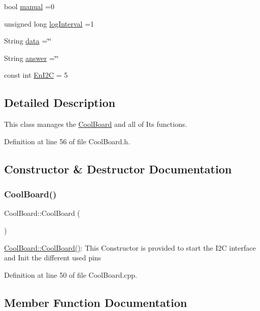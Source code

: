 \begin{DoxyCompactItemize}
\item 
bool \hyperlink{class_cool_board_a7c8e505a5804b109e112d5a03df6ea2b}{manual} =0
\item 
unsigned long \hyperlink{class_cool_board_a84bc94413b64973e4aba8c467c97006c}{log\+Interval} =1
\item 
String \hyperlink{class_cool_board_a427fb753dd8575bdf821c70a5c63d695}{data} =\char`\"{}\char`\"{}
\item 
String \hyperlink{class_cool_board_a7b835fafd449e5282f7f91d787a2dc15}{answer} =\char`\"{}\char`\"{}
\item 
const int \hyperlink{class_cool_board_af1fe1376fc66f93dee80b327ca695377}{En\+I2C} = 5
\end{DoxyCompactItemize}


\subsection{Detailed Description}
This class manages the \hyperlink{class_cool_board}{Cool\+Board} and all of Its functions. 

Definition at line 56 of file Cool\+Board.\+h.



\subsection{Constructor \& Destructor Documentation}
\mbox{\label{class_cool_board_a8b88fd781e22e93025dd63474113b7e4}} 
\subsubsection{\texorpdfstring{Cool\+Board()}{CoolBoard()}}
{\footnotesize\ttfamily Cool\+Board\+::\+Cool\+Board (\begin{DoxyParamCaption}{ }\end{DoxyParamCaption})}

\hyperlink{class_cool_board_a8b88fd781e22e93025dd63474113b7e4}{Cool\+Board\+::\+Cool\+Board()}\+: This Constructor is provided to start the I2C interface and Init the different used pins 

Definition at line 50 of file Cool\+Board.\+cpp.



\subsection{Member Function Documentation}
\mbox{\label{class_cool_board_acba7c5aef7268b2c0044bdb54d3b9d76}} 
